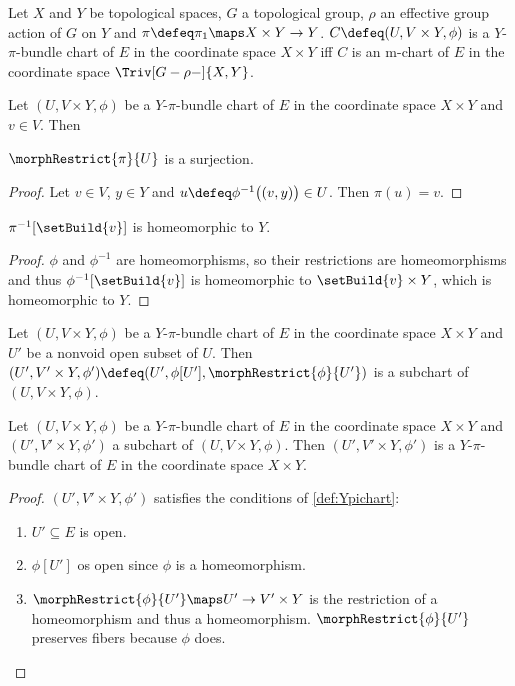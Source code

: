 \documentclass{article}
\begin{document}
\begin{lemma}
\label{lem:GrhomodtrivYpichart}
Let $X$ and $Y$ be topological spaces, $G$ a topological group, $\rho$
an effective group action of $G$ on $Y$ and
$\pi \defeq \pi_1 \maps X \times Y \to Y$.
$C \defeq (U, V \times Y, \phi)$ is a $Y$-$\pi$-bundle chart of $E$ in
the coordinate space $X \times Y$ iff $C$ is an m-chart of $E$ in the
coordinate space $\Triv[G-\rho-]{X,Y}$.

\end{lemma}

\begin{lemma}
\label{def:piepi}
Let $(U, V \times Y, \phi)$ be a $Y$-$\pi$-bundle chart of $E$ in the
coordinate space $X \times Y$ and $v \in V$. Then

$\morphRestrict{\pi}{U}$ is a surjection.
\begin{proof}
Let $v \in V$, $y \in Y$ and
$u \defeq \phi^{-1} \bigl ( (v,y) \bigr ) \in U$. Then $\pi(u) = v$.
\end{proof}
$\pi^{-1}[\setBuild{v}]$ is homeomorphic to $Y$.
\begin{proof}
$\phi$ and $\phi^{-1}$ are homeomorphisms, so their restrictions are
homeomorphisms and thus $\phi^{-1}[\setBuild{v}]$ is homeomorphic to
$\setBuild{v} \times Y$, which is homeomorphic to $Y$.
\end{proof}
\end{lemma}

\begin{definition}[$Y$-$\pi$ subcharts]
\label{def:Ypisub}
Let $(U, V \times Y, \phi)$ be a $Y$-$\pi$-bundle chart of $E$ in the
coordinate space $X \times Y$ and $U'$ be a nonvoid open subset of $U$.
Then
$(U', V' \times Y, \phi') \defeq (U', \phi[U'], \morphRestrict{\phi}{U'})$
is a subchart of $(U, V \times Y, \phi)$.
\end{definition}

\begin{lemma}[$Y$-$\pi$ subcharts]
Let $(U, V \times Y, \phi)$ be a $Y$-$\pi$-bundle chart of $E$ in the
coordinate space $X \times Y$ and $(U', V' \times Y, \phi')$ a subchart
of $(U, V \times Y, \phi)$. Then $(U', V' \times Y, \phi')$ is a
$Y$-$\pi$-bundle chart of $E$ in the coordinate space $X \times Y$.
\begin{proof}
$(U', V' \times Y, \phi')$ satisfies the conditions of \cref{def:Ypichart}:
\begin{enumerate}
\item $U' \subseteq E$ is open.
\item $\phi[U']$ os open since $\phi$ is a homeomorphism.
\item $\morphRestrict{\phi}{U'} \maps U' \to V' \times Y$ is the
restriction of a homeomorphism and thus a homeomorphism.
$\morphRestrict{\phi}{U'}$ preserves fibers because $\phi$ does.
\end{enumerate}
\end{proof}
\end{lemma}
\end{document}
